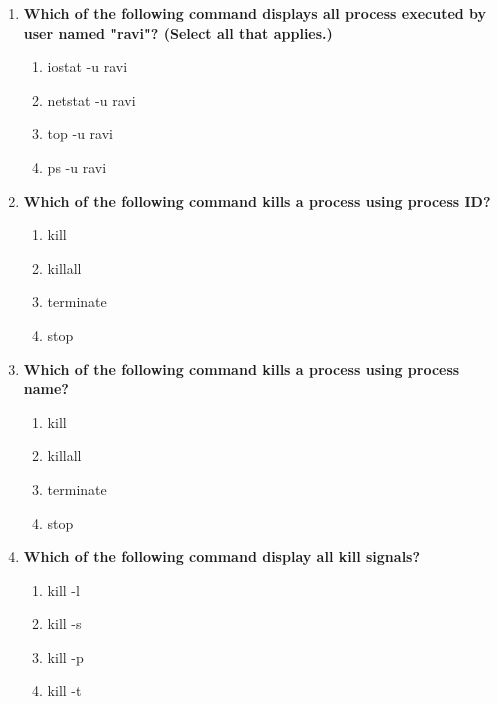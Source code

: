\begin{flushleft}
\begin{enumerate}
		\item \textbf{Which of the following command displays all process executed by user named "ravi"? (Select all that applies.)}
		\begin{enumerate}[label=(\alph*)]
			\item iostat -u ravi
			\item netstat -u ravi
			\item top -u ravi    %
			\item ps -u ravi   %
		\end{enumerate}
		\bigskip
		\bigskip	
		
		\item \textbf{Which of the following command kills a process using process ID?}
		\begin{enumerate}[label=(\alph*)]
			\item kill  %
			\item killall
			\item terminate
			\item stop
		\end{enumerate}
		\bigskip
		\bigskip	

		\item \textbf{Which of the following command kills a process using process name?}
		\begin{enumerate}[label=(\alph*)]
			\item kill  
			\item killall  %
			\item terminate
			\item stop
		\end{enumerate}
		\bigskip
		\bigskip

		\item \textbf{Which of the following command display all kill signals?}
		\begin{enumerate}[label=(\alph*)]
			\item kill -l  %
			\item kill -s
			\item kill -p
			\item kill -t
		\end{enumerate}
		
	\end{enumerate}
	
	
\end{flushleft}

\newpage

